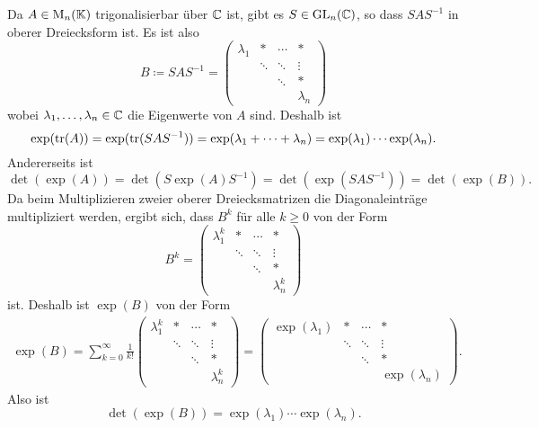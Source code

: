 \documentclass[a4paper, 10pt]{article}
\begin{document}
Da $A \in \operatorname{M}_n(\mathbb{K})$ trigonalisierbar über $\mathbb{C}$ ist, gibt es $S \in \operatorname{GL}_n(\mathbb{C})$, so dass $S A S^{-1}$ in oberer Dreiecksform ist. Es ist also
\[
            B
  \coloneqq S A S^{-1}
  =
  \begin{pmatrix}
    \lambda_1 & *       & \cdots  & *         \\
              & \ddots  & \ddots  & \vdots    \\
              &         & \ddots  & *         \\
              &         &         & \lambda_n
  \end{pmatrix}
\]
wobei $\lambda_1, \dotsc, \lambda_n \in \mathbb{C}$ die Eigenwerte von $A$ sind.
Deshalb ist
\[
    \exp(\operatorname{tr}(A))
  = \exp(\operatorname{tr}(S A S^{-1}))
  = \exp(\lambda_1 + \dotsb + \lambda_n)
  = \exp(\lambda_1) \dotsm \exp(\lambda_n).
\]
Andererseits ist
\[
    \det(\exp(A))
  = \det(S \exp(A) S^{-1})
  = \det( \exp(S A S^{-1}) )
  = \det( \exp(B) ).
\]
Da beim Multiplizieren zweier oberer Dreiecksmatrizen die Diagonaleinträge multipliziert werden, ergibt sich, dass $B^k$ für alle $k \geq 0$ von der Form
\[
  B^k
  =
  \begin{pmatrix}
    \lambda_1^k & *       & \cdots  & *           \\
                & \ddots  & \ddots  & \vdots      \\
                &         & \ddots  & *           \\
                &         &         & \lambda_n^k
  \end{pmatrix}
\]
ist.
Deshalb ist $\exp(B)$ von der Form
\begin{align*}
      \exp(B)
  =  \sum_{k=0}^\infty
      \frac{1}{k!}
      \begin{pmatrix}
        \lambda_1^k  & *      & \cdots  & *             \\
                     & \ddots & \ddots  & \vdots        \\
                     &        & \ddots  & *             \\
                     &        &         & \lambda_n^k
      \end{pmatrix}
  =
      \begin{pmatrix}
        \exp(\lambda_1) & *       & \cdots  & *               \\
                        & \ddots  & \ddots  & \vdots          \\
                        &         & \ddots  & *               \\
                        &         &         & \exp(\lambda_n)
      \end{pmatrix}.
\end{align*}
Also ist
\[
    \det(\exp(B))
  = \exp(\lambda_1) \dotsm \exp(\lambda_n).
\]
\end{document}
